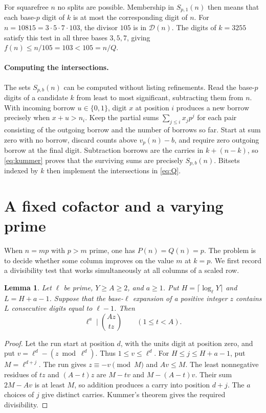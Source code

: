 \documentclass[a4paper,11pt]{article}
\newtheorem{lemma}[theorem]{Lemma}
\newcommand{\crit}{\mathcal D}
\begin{document}
For squarefree \(n\) no splits are possible. Membership in \(S_{p,1}(n)\)
then means that each base-\(p\) digit of \(k\) is at most the corresponding
digit of \(n\). For \(n=10815=3\cdot5\cdot7\cdot103\), the divisor
\(105\) is in \(\crit(n)\). The digits of \(k=3255\) satisfy this test
in all three bases \(3,5,7\), giving \(f(n)\le n/105=103<105=n/Q\).

\paragraph{Computing the intersections.}
The sets \(S_{p,b}(n)\) can be computed without listing refinements.
Read the base-\(p\) digits of a candidate \(k\) from least to most
significant, subtracting them from \(n\). With incoming borrow \(u\in\{0,1\}\),
digit \(x\) at position \(i\) produces a new borrow precisely when
\(x+u>n_i\). Keep the partial sums \(\sum_{j\le i}x_jp^j\) for each
pair consisting of the outgoing borrow and the number of borrows so far.
Start at sum zero with no borrow, discard counts above \(v_p(n)-b\),
and require zero outgoing borrow at the final digit. Subtraction borrows
are the carries in \(k+(n-k)\), so \eqref{eq:kummer} proves that the
surviving sums are precisely \(S_{p,b}(n)\). Bitsets indexed by \(k\)
then implement the intersections in \eqref{eq:Q}.

\section{A fixed cofactor and a varying prime}\label{sec:primes}

When \(n=mp\) with \(p>m\) prime, one has \(P(n)=Q(n)=p\).
The problem is to decide whether some column improves on the value \(m\)
at \(k=p\). We first record a divisibility test that works simultaneously
at all columns of a scaled row.

\begin{lemma}\label{lem:block}
Let \(\ell\) be prime, \(Y\ge A\ge2\), and \(a\ge1\). Put
\(H=\lceil\log_\ell Y\rceil\) and \(L=H+a-1\). Suppose that the
base-\(\ell\) expansion of a positive integer \(z\) contains \(L\)
consecutive digits equal to \(\ell-1\). Then
\[
   \ell^a\mid\binom{Az}{tz}\qquad(1\le t<A).
\]
\end{lemma}

\begin{proof}
Let the run start at position \(d\), with the units digit at position
zero, and put \(v=\ell^d-(z\bmod\ell^d)\). Thus \(1\le v\le\ell^d\).
For \(H\le j\le H+a-1\), put \(M=\ell^{d+j}\). The run gives
\(z\equiv-v\pmod M\) and \(Av\le M\). The least nonnegative residues
of \(tz\) and \((A-t)z\) are \(M-tv\) and \(M-(A-t)v\).
Their sum \(2M-Av\) is at least \(M\), so addition produces a carry
into position \(d+j\). The \(a\) choices of \(j\) give distinct carries.
Kummer's theorem gives the required divisibility.
\end{proof}
\end{document}
